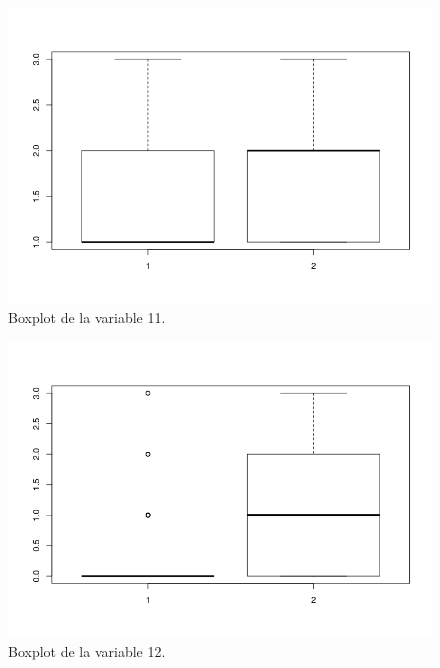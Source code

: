 \documentclass[12pt,a4paper]{article}
\begin{document}
\begin{figure}[H]
	\centering
	\includegraphics[scale=0.6]{./Imagenes/EDA/Clasificacion/boxplot_variable11.png}
	\caption{Boxplot de la variable 11.}
\end{figure}

\begin{figure}[H]
	\centering
	\includegraphics[scale=0.6]{./Imagenes/EDA/Clasificacion/boxplot_variable12.png}
	\caption{Boxplot de la variable 12.}
\end{figure}
\end{document}
